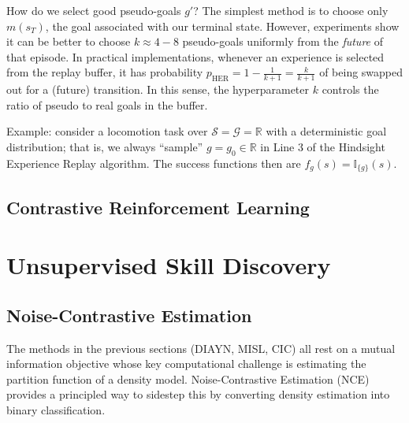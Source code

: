 \documentclass[11pt, letterpaper]{article}
\begin{document}
\begin{remark}
    How do we select good pseudo-goals \(g'\)? The simplest method is to choose only \(m(s_T)\), the goal associated with our terminal state. However, experiments show it can be better to choose \(k\approx 4-8\) pseudo-goals uniformly from the \textit{future} of that episode. In practical implementations, whenever an experience is selected from the replay buffer, it has probability \(p_{\text{HER}} = 1 - \frac{1}{k+1} = \frac{k}{k+1}\) of being swapped out for a (future) transition. In this sense, the hyperparameter \(k\) controls the ratio of pseudo to real goals in the buffer.
\end{remark}

\begin{remark}
    Example: consider a locomotion task over \(\mathcal{S} = \mathcal{G} = \mathbb{R}\) with a deterministic goal distribution; that is, we always ``sample'' \(g = g_0 \in \mathbb{R}\) in Line 3 of the Hindsight Experience Replay algorithm. The success functions then are \(f_g(s) = \mathbb{I}_{\{g\}}(s)\). 
\end{remark}

\subsection{Contrastive Reinforcement Learning}

\begin{concept}
\end{concept}

\newpage
\section{Unsupervised Skill Discovery}

\subsection{Noise-Contrastive Estimation}

The methods in the previous sections (DIAYN, MISL, CIC) all rest on a mutual information objective whose key computational challenge is estimating the partition function of a density model. Noise-Contrastive Estimation (NCE) provides a principled way to sidestep this by converting density estimation into binary classification.
\end{document}
